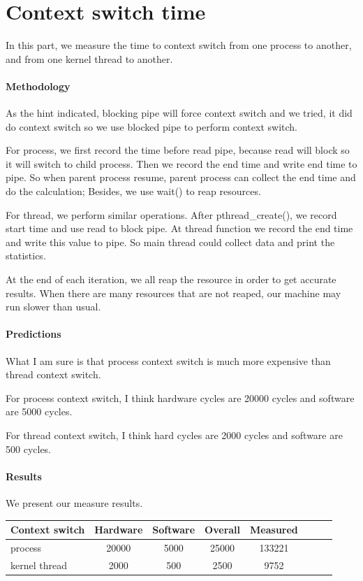 \section{Context switch time}
In this part, we measure the time to context switch from one process to another, and from one kernel thread to another.

\paragraph{Methodology}
As the hint indicated, blocking pipe will force context switch and we tried, it did do context switch so we use blocked pipe to perform context switch.

For process, we first record the time before read pipe, because read will block so it will switch to child process. Then we record the end time and write end time to pipe. So when parent process resume, parent process can collect the end time and do the calculation; Besides, we use wait() to reap resources.

For thread, we perform similar operations. After pthread\_create(), we record start time and use read to block pipe. At thread function we record the end time and write this value to pipe. So main thread could collect data and print the statistics.

At the end of each iteration, we all reap the resource in order to get accurate results. When there are many resources that are not reaped, our machine may run slower than usual.

\paragraph{Predictions}
What I am sure is that process context switch is much more expensive than thread context switch.

For process context switch, I think hardware cycles are 20000 cycles and software are 5000 cycles.

For thread context switch, I think hard cycles are 2000 cycles and software are 500 cycles.

\paragraph{Results}
We present our measure results.

\begin{center}
\begin{tabular}{l*{6}{c}r}
Context switch              & Hardware  & Software  & Overall  & Measured   \\
\hline
process & 20000 & 5000 & 25000 & 133221  \\
kernel thread    & 2000 & 500 & 2500 & 9752 \\
\end{tabular}
\end{center}

